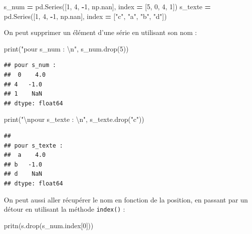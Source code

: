 \documentclass[12pt,]{book}
\newenvironment{Shaded}{\begin{snugshade}}{\end{snugshade}}
\newcommand{\DecValTok}[1]{\textcolor[rgb]{0.00,0.00,0.81}{#1}}
\newcommand{\CharTok}[1]{\textcolor[rgb]{0.31,0.60,0.02}{#1}}
\newcommand{\StringTok}[1]{\textcolor[rgb]{0.31,0.60,0.02}{#1}}
\newcommand{\OperatorTok}[1]{\textcolor[rgb]{0.81,0.36,0.00}{\textbf{#1}}}
\newcommand{\BuiltInTok}[1]{#1}
\newcommand{\NormalTok}[1]{#1}
\numberwithin{equation}{section}
\numberwithin{countremarque}{section}
\begin{document}
\begin{Shaded}
\begin{Highlighting}[]
\NormalTok{s_num }\OperatorTok{=}\NormalTok{ pd.Series([}\DecValTok{1}\NormalTok{, }\DecValTok{4}\NormalTok{, }\OperatorTok{-}\DecValTok{1}\NormalTok{, np.nan],}
\NormalTok{             index }\OperatorTok{=}\NormalTok{ [}\DecValTok{5}\NormalTok{, }\DecValTok{0}\NormalTok{, }\DecValTok{4}\NormalTok{, }\DecValTok{1}\NormalTok{])}
\NormalTok{s_texte }\OperatorTok{=}\NormalTok{ pd.Series([}\DecValTok{1}\NormalTok{, }\DecValTok{4}\NormalTok{, }\OperatorTok{-}\DecValTok{1}\NormalTok{, np.nan],}
\NormalTok{             index }\OperatorTok{=}\NormalTok{ [}\StringTok{"c"}\NormalTok{, }\StringTok{"a"}\NormalTok{, }\StringTok{"b"}\NormalTok{, }\StringTok{"d"}\NormalTok{])}
\end{Highlighting}
\end{Shaded}

On peut supprimer un élément d'une série en utilisant son nom :

\begin{Shaded}
\begin{Highlighting}[]
\BuiltInTok{print}\NormalTok{(}\StringTok{"pour s_num : }\CharTok{\textbackslash{}n}\StringTok{"}\NormalTok{, s_num.drop(}\DecValTok{5}\NormalTok{))}
\end{Highlighting}
\end{Shaded}

\begin{lstlisting}
## pour s_num : 
##  0    4.0
## 4   -1.0
## 1    NaN
## dtype: float64
\end{lstlisting}

\begin{Shaded}
\begin{Highlighting}[]
\BuiltInTok{print}\NormalTok{(}\StringTok{"}\CharTok{\textbackslash{}n}\StringTok{pour s_texte : }\CharTok{\textbackslash{}n}\StringTok{"}\NormalTok{, s_texte.drop(}\StringTok{"c"}\NormalTok{))}
\end{Highlighting}
\end{Shaded}

\begin{lstlisting}
## 
## pour s_texte : 
##  a    4.0
## b   -1.0
## d    NaN
## dtype: float64
\end{lstlisting}

On peut aussi aller récupérer le nom en fonction de la position, en
passant par un détour en utilisant la méthode \texttt{index()} :

\begin{Shaded}
\begin{Highlighting}[]
\NormalTok{pritn(s.drop(s_num.index[}\DecValTok{0}\NormalTok{]))}
\end{Highlighting}
\end{Shaded}
\end{document}
